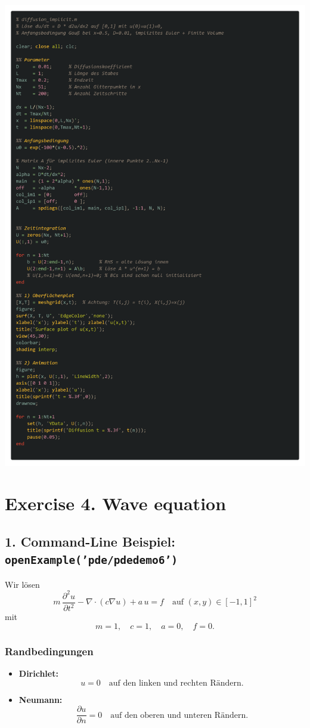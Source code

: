 \documentclass{scrartcl}
\begin{document}
\includegraphics[scale=0.16]{HeatCode.png}
\section*{Exercise 4. Wave equation}
\subsection*{1. Command-Line Beispiel: \texttt{openExample('pde/pdedemo6')}}

Wir lösen
\[
m\,\frac{\partial^2u}{\partial t^2}
- \nabla\!\cdot(c \nabla u) + a\,u = f
\quad\text{auf }(x,y)\in[-1,1]^2
\]
mit
\[
m=1,\quad c=1,\quad a=0,\quad f=0.
\]

\subsubsection*{Randbedingungen}
\begin{itemize}
  \item \textbf{Dirichlet:} 
  \[
    u = 0
    \quad\text{auf den linken und rechten Rändern.}
  \]
  \item \textbf{Neumann:} 
  \[
    \frac{\partial u}{\partial n} = 0
    \quad\text{auf den oberen und unteren Rändern.}
  \]
\end{itemize}
\end{document}

